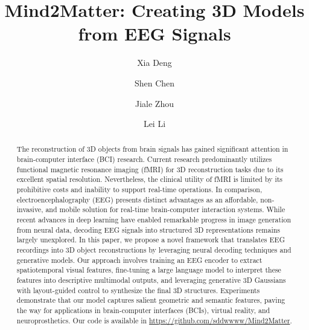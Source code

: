 \documentclass[sigconf]{acmart}
\begin{document}
\title{Mind2Matter: Creating 3D Models from EEG Signals}

\author{Xia Deng}

\author{Shen Chen}
\authornotemark[1]


\author{Jiale Zhou}

\author{Lei Li}
\authornotemark[2]




\begin{abstract}
 The reconstruction of 3D objects from brain signals has gained significant attention in brain-computer interface (BCI) research. Current research predominantly utilizes functional magnetic resonance imaging (fMRI) for 3D reconstruction tasks due to its excellent spatial resolution. Nevertheless, the clinical utility of fMRI is limited by its prohibitive costs and inability to support real-time operations. In comparison, electroencephalography (EEG) presents distinct advantages as an affordable, non-invasive, and mobile solution for real-time brain-computer interaction systems. While recent advances in deep learning have enabled remarkable progress in image generation from neural data, decoding EEG signals into structured 3D representations remains largely unexplored. In this paper, we propose a novel framework that translates EEG recordings into 3D object reconstructions by leveraging neural decoding techniques and generative models. Our approach involves training an EEG encoder to extract spatiotemporal visual features, fine-tuning a large language model to interpret these features into descriptive multimodal outputs, and leveraging generative 3D Gaussians with layout-guided control to synthesize the final 3D structures. Experiments demonstrate that our model captures salient geometric and semantic features, paving the way for applications in brain-computer interfaces (BCIs), virtual reality, and neuroprosthetics. Our code is available in \url{https://github.com/sddwwww/Mind2Matter}. 
\end{abstract}
\end{document}
